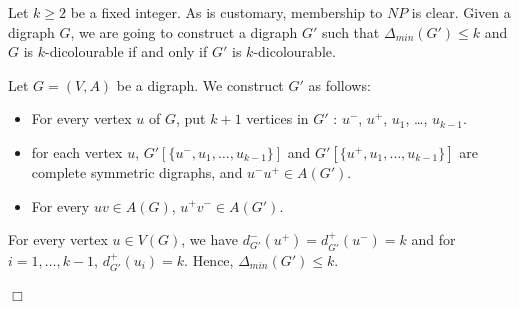 \documentclass[11pt]{article}
\newcommand{\dmin}{\Delta_{min}}
\newcounter{claim}
\newenvironment{proof}[1][]%
 {\noindent {\setcounter{claim}{0}\sc proof ---
   }{#1}{}}{\hfill$\Box$\vspace{2ex}}
\newenvironment{claim}[1][]%
{\refstepcounter{claim}\vspace{1ex}\noindent{(\it\arabic{claim}){#1}{}}\it}{\vspace{1ex}}
\newenvironment{proofclaim}[1][]%
	{\noindent {}{#1}{}}{ This proves~(\arabic{claim}).\vspace{2ex}}
\begin{document}
\begin{proof}
Let $k \geq 2$ be a fixed integer. 
As is customary, membership to $NP$ is clear.
Given a digraph $G$, we are going to construct a digraph $G'$ such that $\dmin(G') \leq k$ and $G$ is $k$-dicolourable if and only if $G'$ is $k$-dicolourable. 


Let $G=(V,A)$ be a digraph. We construct $G'$ as follows:
\begin{itemize}
    \item For every vertex $u$ of $G$, put $k+1$ vertices in $G'$ : $u^-$,  $u^+$, $u_1$, \dots, $u_{k-1}$.
    \item for each vertex $u$, $G'[\{u^-, u_1, \dots, u_{k-1}\}]$ and $G'[\{u^+, u_1, \dots, u_{k-1}\}]$ are complete symmetric digraphs, and $u^-u^+ \in A(G')$. 
    \item For every $uv \in A(G)$, $u^+v^- \in A(G')$. 
\end{itemize}

For every vertex $u \in V(G)$, we have $d_{G'}^-(u^+) =d_{G'}^+(u^-) = k$ and for $i=1, \dots, k-1$, $d^+_{G'}(u_i) = k$. Hence, $\dmin(G') \leq k$. 









\end{proof}
\end{document}
